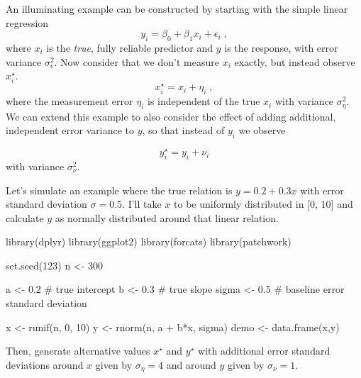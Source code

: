 \documentclass[
  letterpaper,
  10pt,
  krantz2]{krantz}
\makeatletter
\newenvironment{Shaded}{\begin{snugshade}}{\end{snugshade}}
\newcommand{\CommentTok}[1]{\textcolor[rgb]{0.37,0.37,0.37}{#1}}
\newcommand{\DecValTok}[1]{\textcolor[rgb]{0.68,0.00,0.00}{#1}}
\newcommand{\FloatTok}[1]{\textcolor[rgb]{0.68,0.00,0.00}{#1}}
\newcommand{\FunctionTok}[1]{\textcolor[rgb]{0.28,0.35,0.67}{#1}}
\newcommand{\NormalTok}[1]{\textcolor[rgb]{0.00,0.23,0.31}{#1}}
\newcommand{\OtherTok}[1]{\textcolor[rgb]{0.00,0.23,0.31}{#1}}
\newcommand{\SpecialCharTok}[1]{\textcolor[rgb]{0.37,0.37,0.37}{#1}}
\newenvironment{kframe}{%
  \medskip{}
  \setlength{\fboxsep}{.8em}
  \def\at@end@of@kframe{}%
  \ifinner\ifhmode%
  \def\at@end@of@kframe{\end{minipage}}%
  \begin{minipage}{\columnwidth}%
  \fi\fi%
  \def\FrameCommand##1{\hskip\@totalleftmargin \hskip-\fboxsep
  \colorbox{shadecolor}{##1}\hskip-\fboxsep
      \hskip-\linewidth \hskip-\@totalleftmargin \hskip\columnwidth}%
  \MakeFramed {\advance\hsize-\width
    \@totalleftmargin\z@ \linewidth\hsize
    \@setminipage}}%
{\par\unskip\endMakeFramed%
  \at@end@of@kframe}
\renewenvironment{Shaded}{\begin{kframe}}{\end{kframe}}
\makeatother
\begin{document}
An illuminating example can be constructed by starting with the simple
linear regression \[
y_i = \beta_0 + \beta_1 x_i + \epsilon_i \; ,
\] where \(x_i\) is the \emph{true}, fully reliable predictor and \(y\)
is the response, with error variance \(\sigma_\epsilon^2\). Now consider
that we don't measure \(x_i\) exactly, but instead observe
\(x^\star_i\). \[
x^\star_i = x_i + \eta_i \; ,
\] where the measurement error \(\eta_i\) is independent of the true
\(x_i\) with variance \(\sigma^2_\eta\). We can extend this example to
also consider the effect of adding additional, independent error
variance to \(y\), so that instead of \(y_i\) we observe

\[
y^\star_i = y_i + \nu_i
\] with variance \(\sigma^2_\nu\).

Let's simulate an example where the true relation is \(y = 0.2 + 0.3 x\)
with error standard deviation \(\sigma = 0.5\). I'll take \(x\) to be
uniformly distributed in {[}0, 10{]} and calculate \(y\) as normally
distributed around that linear relation.

\begin{Shaded}
\begin{Highlighting}[]
\FunctionTok{library}\NormalTok{(dplyr)}
\FunctionTok{library}\NormalTok{(ggplot2)}
\FunctionTok{library}\NormalTok{(forcats)}
\FunctionTok{library}\NormalTok{(patchwork)}

\FunctionTok{set.seed}\NormalTok{(}\DecValTok{123}\NormalTok{)}
\NormalTok{n }\OtherTok{\textless{}{-}} \DecValTok{300}

\NormalTok{a }\OtherTok{\textless{}{-}} \FloatTok{0.2}    \CommentTok{\# true intercept}
\NormalTok{b }\OtherTok{\textless{}{-}} \FloatTok{0.3}    \CommentTok{\# true slope}
\NormalTok{sigma }\OtherTok{\textless{}{-}} \FloatTok{0.5} \CommentTok{\# baseline error standard deviation}

\NormalTok{x }\OtherTok{\textless{}{-}} \FunctionTok{runif}\NormalTok{(n, }\DecValTok{0}\NormalTok{, }\DecValTok{10}\NormalTok{)}
\NormalTok{y }\OtherTok{\textless{}{-}} \FunctionTok{rnorm}\NormalTok{(n, a }\SpecialCharTok{+}\NormalTok{ b}\SpecialCharTok{*}\NormalTok{x, sigma)}
\NormalTok{demo }\OtherTok{\textless{}{-}} \FunctionTok{data.frame}\NormalTok{(x,y)}
\end{Highlighting}
\end{Shaded}

Then, generate alternative values \(x^\star\) and \(y^\star\) with
additional error standard deviations around \(x\) given by
\(\sigma_\eta = 4\) and around \(y\) given by \(\sigma_\nu = 1\).
\end{document}
